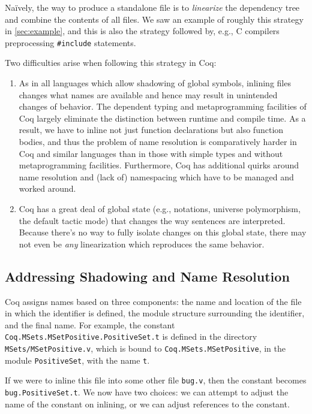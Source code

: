 \documentclass[a4paper,USenglish,cleveref,autoref,thm-restate]{lipics-v2021}
\begin{document}
Na\"ively, the way to produce a standalone file is to \emph{linearize} the dependency tree and combine the contents of all files.
We saw an example of roughly this strategy in \autoref{sec:example}, and this is also the strategy followed by, e.g., C compilers preprocessing \verb|#include| statements.

Two difficulties arise when following this strategy in Coq:
\begin{enumerate}
\item As in all languages which allow shadowing of global symbols, inlining files changes what names are available and hence may result in unintended changes of behavior.
The dependent typing and metaprogramming facilities of Coq largely eliminate the distinction between runtime and compile time.
As a result, we have to inline not just function declarations but also function bodies, and thus the problem of name resolution is comparatively harder in Coq and similar languages than in those with simple types and without metaprogramming facilities.
Furthermore, Coq has additional quirks around name resolution and (lack of) namespacing which have to be managed and worked around.
\item Coq has a great deal of global state (e.g., notations, universe polymorphism, the default tactic mode) that changes the way sentences are interpreted.
Because there's no way to fully isolate changes on this global state, there may not even be \emph{any} linearization which reproduces the same behavior.
\end{enumerate}

\subsection{Addressing Shadowing and Name Resolution}\label{sec:name-resolution}
Coq assigns names based on three components: the name and location of the file in which the identifier is defined, the module structure surrounding the identifier, and the final name.
For example, the constant \texttt{Coq.MSets.MSetPositive.PositiveSet.t} is defined in the directory \texttt{MSets/MSetPositive.v}, which is bound to \texttt{Coq.MSets.MSetPositive}, in the module \texttt{PositiveSet}, with the name \texttt{t}.

If we were to inline this file into some other file \texttt{bug.v}, then the constant becomes \texttt{bug.PositiveSet.t}.
We now have two choices: we can attempt to adjust the name of the constant on inlining, or we can adjust references to the constant.
\end{document}
